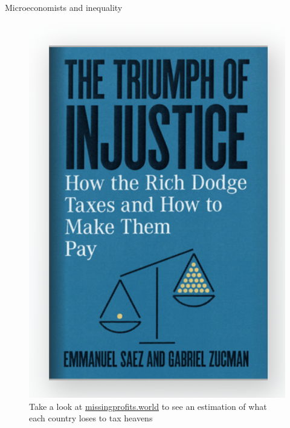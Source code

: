 \documentclass[handout]{beamer}
\begin{document}
\begin{frame}{Microeconomists and inequality}

\begin{figure}
	\includegraphics[scale=0.35]{justice.png}
	\caption{Take a look at \href{https://missingprofits.world/}{missingprofits.world} to see an estimation of what each country loses to tax heavens}
\end{figure}

\end{frame}
\end{document}
